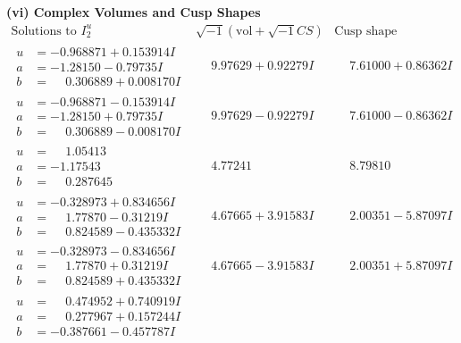 \documentclass[1p]{elsarticle_modified}
\theoremstyle{definition}
\newcommand{\I}{\sqrt{-1}}
\begin{document}
\newpage\flushleft \textbf{(vi) Complex Volumes and Cusp Shapes}
$$\begin{array}{c|c|c}  
\text{Solutions to }I^u_{2}& \I (\text{vol} + \sqrt{-1}CS) & \text{Cusp shape}\\
 \hline 
\begin{aligned}
u &= -0.968871 + 0.153914 I \\
a &= -1.28150 - 0.79735 I \\
b &= \phantom{-}0.306889 + 0.008170 I\end{aligned}
 & \phantom{-}9.97629 + 0.92279 I & \phantom{-}7.61000 + 0.86362 I \\ \hline\begin{aligned}
u &= -0.968871 - 0.153914 I \\
a &= -1.28150 + 0.79735 I \\
b &= \phantom{-}0.306889 - 0.008170 I\end{aligned}
 & \phantom{-}9.97629 - 0.92279 I & \phantom{-}7.61000 - 0.86362 I \\ \hline\begin{aligned}
u &= \phantom{-}1.05413\phantom{ +0.000000I} \\
a &= -1.17543\phantom{ +0.000000I} \\
b &= \phantom{-}0.287645\phantom{ +0.000000I}\end{aligned}
 & \phantom{-}4.77241\phantom{ +0.000000I} & \phantom{-}8.79810\phantom{ +0.000000I} \\ \hline\begin{aligned}
u &= -0.328973 + 0.834656 I \\
a &= \phantom{-}1.77870 - 0.31219 I \\
b &= \phantom{-}0.824589 - 0.435332 I\end{aligned}
 & \phantom{-}4.67665 + 3.91583 I & \phantom{-}2.00351 - 5.87097 I \\ \hline\begin{aligned}
u &= -0.328973 - 0.834656 I \\
a &= \phantom{-}1.77870 + 0.31219 I \\
b &= \phantom{-}0.824589 + 0.435332 I\end{aligned}
 & \phantom{-}4.67665 - 3.91583 I & \phantom{-}2.00351 + 5.87097 I \\ \hline\begin{aligned}
u &= \phantom{-}0.474952 + 0.740919 I \\
a &= \phantom{-}0.277967 + 0.157244 I \\
b &= -0.387661 - 0.457787 I\end{aligned}

\end{array}$$
\end{document}
